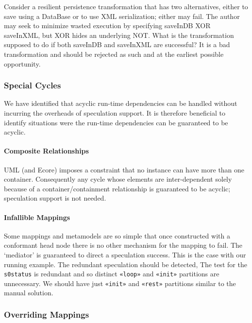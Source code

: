 \documentclass{jot}
\begin{document}
Consider a resilient persistence transformation that has two alternatives, either to save using a DataBase or to use XML serialization; either may fail. The author may seek to minimize wasted execution by specifying saveInDB XOR saveInXML, but XOR hides an underlying NOT. What is the transformation supposed to do if both saveInDB and saveInXML are successful? It is a bad transformation and should be rejected as such and at the earliest possible opportunity.

\subsubsection{Special Cycles}

We have identified that acyclic run-time dependencies can be handled without incurring the overheads of speculation support. It is therefore beneficial to identify situations were the run-time dependencies can be guaranteed to be acyclic.

\paragraph{Composite Relationships}

UML (and Ecore) imposes a constraint that no instance can have more than one container. Consequently any cycle whose elements are inter-dependent solely because of a container/containment relationship is guaranteed to be acyclic; speculation support is not needed.

\paragraph{Infallible Mappings}\label{Infallible Mappings}

Some mappings and metamodels are so simple that once constructed with a conformant head node there is no other mechanism for the mapping to fail. The `mediator' is guaranteed to direct a speculation success. This is the case with our running example. The redundant speculation should be detected, The test for the \verb|s0status| is redundant and so distinct \verb|«loop»| and \verb|«init»| partitions are unnecessary. We should have just \verb|«init»| and \verb|«rest»| partitions similar to the manual solution.

\subsubsection{Overriding Mappings}
\end{document}
